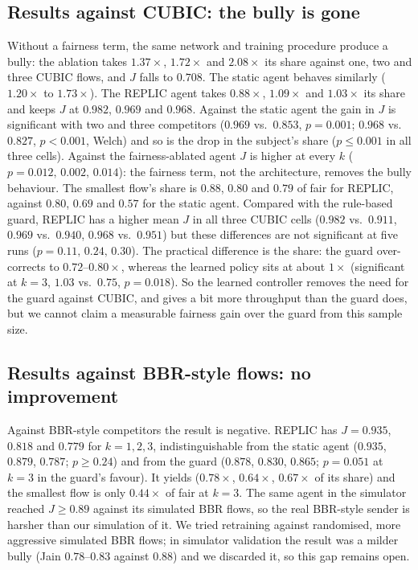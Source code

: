 \subsection{Results against CUBIC: the bully is gone}
Without a fairness term, the same network and training procedure produce a bully: the ablation takes $1.37\times$, $1.72\times$ and $2.08\times$ its share against one, two and three CUBIC flows, and $J$ falls to $0.708$. The static agent behaves similarly ($1.20\times$ to $1.73\times$). The REPLIC agent takes $0.88\times$, $1.09\times$ and $1.03\times$ its share and keeps $J$ at $0.982$, $0.969$ and $0.968$. Against the static agent the gain in $J$ is significant with two and three competitors ($0.969$ vs.\ $0.853$, $p=0.001$; $0.968$ vs.\ $0.827$, $p<0.001$, Welch) and so is the drop in the subject's share ($p\le0.001$ in all three cells). Against the fairness-ablated agent $J$ is higher at every $k$ ($p=0.012,\,0.002,\,0.014$): the fairness term, not the architecture, removes the bully behaviour. The smallest flow's share is $0.88$, $0.80$ and $0.79$ of fair for REPLIC, against $0.80$, $0.69$ and $0.57$ for the static agent.
Compared with the rule-based guard, REPLIC has a higher mean $J$ in all three CUBIC cells ($0.982$ vs.\ $0.911$, $0.969$ vs.\ $0.940$, $0.968$ vs.\ $0.951$) but these differences are not significant at five runs ($p=0.11,\,0.24,\,0.30$). The practical difference is the share: the guard over-corrects to $0.72$--$0.80\times$, whereas the learned policy sits at about $1\times$ (significant at $k=3$, $1.03$ vs.\ $0.75$, $p=0.018$). So the learned controller removes the need for the guard against CUBIC, and gives a bit more throughput than the guard does, but we cannot claim a measurable fairness gain over the guard from this sample size.

\subsection{Results against BBR-style flows: no improvement}
Against BBR-style competitors the result is negative. REPLIC has $J=0.935$, $0.818$ and $0.779$ for $k=1,2,3$, indistinguishable from the static agent ($0.935$, $0.879$, $0.787$; $p\ge0.24$) and from the guard ($0.878$, $0.830$, $0.865$; $p=0.051$ at $k=3$ in the guard's favour). It yields ($0.78\times$, $0.64\times$, $0.67\times$ of its share) and the smallest flow is only $0.44\times$ of fair at $k=3$. The same agent in the simulator reached $J\ge0.89$ against its simulated BBR flows, so the real BBR-style sender is harsher than our simulation of it. We tried retraining against randomised, more aggressive simulated BBR flows; in simulator validation the result was a milder bully (Jain $0.78$--$0.83$ against $0.88$) and we discarded it, so this gap remains open.

